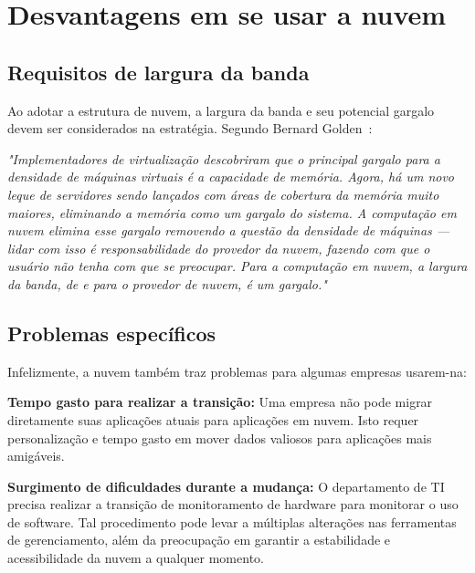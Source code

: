\section{Desvantagens em se usar a nuvem}

\subsection{Requisitos de largura da banda}

Ao adotar a estrutura de nuvem, a largura da banda e seu potencial gargalo devem ser 
considerados na estratégia. Segundo Bernard 
Golden~\cite{cio-cloud-computing-bottleneck}:

\begin{displayquote}
\emph{
    "Implementadores de virtualização descobriram que o principal gargalo para a 
    densidade de máquinas virtuais é a capacidade de memória. Agora, há um novo
    leque de servidores sendo lançados com áreas de cobertura da memória muito
    maiores, eliminando a memória como um gargalo do sistema. A computação em nuvem
    elimina esse gargalo removendo a questão da densidade de máquinas --- lidar com
    isso é responsabilidade do provedor da nuvem, fazendo com que o usuário não tenha
    com que se preocupar.
    Para a computação em nuvem, a largura da banda, de e para o provedor de nuvem,
    é um gargalo."
}
\end{displayquote}

\subsection{Problemas específicos}

Infelizmente, a nuvem também traz problemas para algumas empresas usarem-na:

\newcommand{\itemm}[1]{\item\textbf{#1}}

\begin{itemise}

    \itemm{Tempo gasto para realizar a transição:} Uma empresa não pode migrar
    diretamente suas aplicações atuais para aplicações em nuvem. Isto requer
    personalização e tempo gasto em mover dados valiosos para aplicações mais
    amigáveis.

    \itemm{Surgimento de dificuldades durante a mudança:} O departamento de TI
    precisa realizar a transição de monitoramento de hardware para monitorar o uso
    de software. Tal procedimento pode levar a múltiplas alterações nas ferramentas de
    gerenciamento, além da preocupação em garantir a estabilidade e acessibilidade
    da nuvem a qualquer momento.

\end{itemise}

\undef\itemm
